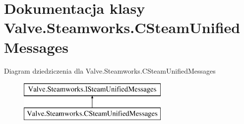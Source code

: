 \hypertarget{class_valve_1_1_steamworks_1_1_c_steam_unified_messages}{}\section{Dokumentacja klasy Valve.\+Steamworks.\+C\+Steam\+Unified\+Messages}
\label{class_valve_1_1_steamworks_1_1_c_steam_unified_messages}
Diagram dziedziczenia dla Valve.\+Steamworks.\+C\+Steam\+Unified\+Messages\begin{figure}[H]
\begin{center}
\leavevmode
\includegraphics[height=2.000000cm]{class_valve_1_1_steamworks_1_1_c_steam_unified_messages}
\end{center}
\end{figure}
